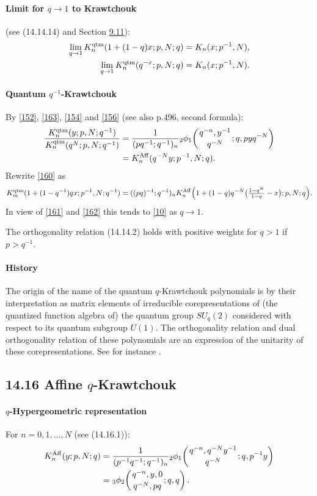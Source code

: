 \documentclass[twoside,11pt]{article}
\newcommand{\qhypK}[5]{ \mbox{}_{#1}\phi_{#2}\!\left(
  \genfrac{}{}{0pt}{}{#3}{#4};#5\right)}
\begin{document}
\paragraph{Limit for $q\to1$ to Krawtchouk} (see (14.14.14) and Section \hyperref[sec9.11]{9.11}):
\begin{align}
\lim_{q\to1} K_n^{\rm qtm}(1+(1-q)x;p,N;q)&=K_n(x;p^{-1},N),
\label{161}\\
\lim_{q\to1} K_n^{\rm qtm}(q^{-x};p,N;q)&=K_n(x;p^{-1},N).
\label{164}
\end{align}
%
\paragraph{Quantum $q^{-1}$-Krawtchouk}
By \eqref{152}, \eqref{163}, \eqref{154} and \eqref{156}
(see also p.496, second formula):
\begin{align}
\frac{K_n^{\rm qtm}(y;p,N;q^{-1})}
{K_n^{\rm qtm}(q^N;p,N;q^{-1})}
&=\frac1{(pq^{-1};q^{-1})_n} \qhypK21{q^{-n},y^{-1}}{q^{-N}}{q,pyq^{-N}}
\label{155}\\
&=K_n^{\rm Aff}(q^{-N}y;p^{-1},N;q).
\label{160}
\end{align}
Rewrite \eqref{160} as
\[
K_m^{\rm qtm}(1+(1-q^{-1})qx;p^{-1},N;q^{-1})
=((pq)^{-1};q^{-1})_n K_n^{\rm Aff}\Big(1+(1-q)q^{-N}\big(\tfrac{1-q^N}{1-q}-x\big);p,N;q\Big).
\]
In view of \eqref{161} and \eqref{162} this tends to \eqref{10} as $q\to1$.

The orthogonality relation (14.14.2) holds with positive weights for $q>1$
if $p>q^{-1}$.
%
\paragraph{History}
The origin of the name of the quantum $q$-Krawtchouk polynomials
is by their interpretation
as matrix elements of irreducible corepresentations of (the quantized
function algebra of) the quantum group $SU_q(2)$ considered
with respect to its quantum subgroup $U(1)$. The orthogonality
relation and dual orthogonality relation of these polynomials
are an expression of the unitarity of these corepresentations.
See for instance .
%
\subsection*{14.16 Affine $q$-Krawtchouk}
\label{sec14.16}
%
\paragraph{$q$-Hypergeometric representation}
For $n=0,1,\ldots,N$
(see (14.16.1)):
\begin{align}
K_n^{\rm Aff}(y;p,N;q)
&=\frac1{(p^{-1}q^{-1};q^{-1})_n} \qhypK21{q^{-n},q^{-N}y^{-1}}{q^{-N}}{q,p^{-1}y}
\label{156}\\
&=\qhypK32{q^{-n},y,0}{q^{-N},pq}{q,q}.
\label{157}
\end{align}
%
\end{document}
